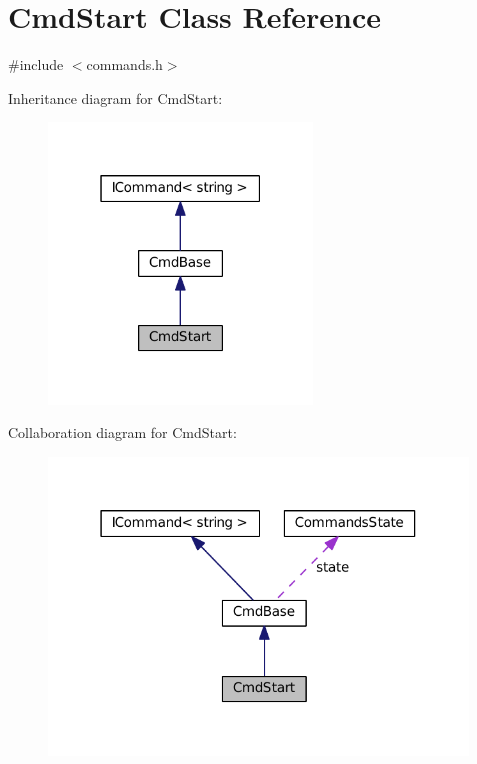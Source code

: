 \hypertarget{class_cmd_start}{}\section{Cmd\+Start Class Reference}
\label{class_cmd_start}


{\ttfamily \#include $<$commands.\+h$>$}



Inheritance diagram for Cmd\+Start\+:
\nopagebreak
\begin{figure}[H]
\begin{center}
\leavevmode
\includegraphics[width=199pt]{class_cmd_start__inherit__graph}
\end{center}
\end{figure}


Collaboration diagram for Cmd\+Start\+:
\nopagebreak
\begin{figure}[H]
\begin{center}
\leavevmode
\includegraphics[width=316pt]{class_cmd_start__coll__graph}
\end{center}
\end{figure}
